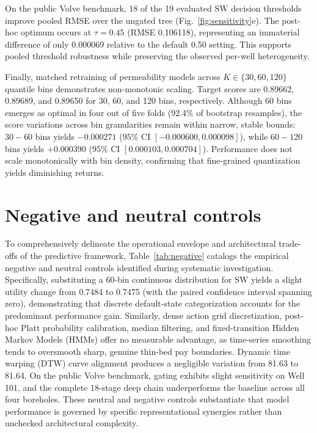 \documentclass[preprint,12pt,nopreprintline]{elsarticle}
\begin{document}
On the public Volve benchmark, 18 of the 19 evaluated $\mathrm{SW}$ decision thresholds improve pooled RMSE over the ungated tree (Fig.~\ref{fig:sensitivity}e). The post-hoc optimum occurs at $\tau = 0.45$ (RMSE 0.106118), representing an immaterial difference of only 0.000069 relative to the default 0.50 setting. This supports pooled threshold robustness while preserving the observed per-well heterogeneity.

Finally, matched retraining of permeability models across $K \in \{30, 60, 120\}$ quantile bins demonstrates non-monotonic scaling. Target scores are 0.89662, 0.89689, and 0.89650 for 30, 60, and 120 bins, respectively. Although 60 bins emerges as optimal in four out of five folds ($92.4\%$ of bootstrap resamples), the score variations across bin granularities remain within narrow, stable bounds: $30 - 60$ bins yields $-0.000271$ ($95\%$ CI $[-0.000600, 0.000098]$), while $60 - 120$ bins yields $+0.000390$ ($95\%$ CI $[0.000103, 0.000704]$). Performance does not scale monotonically with bin density, confirming that fine-grained quantization yields diminishing returns.

\section{Negative and neutral controls}
\label{sec:negative}
To comprehensively delineate the operational envelope and architectural trade-offs of the predictive framework, Table~\ref{tab:negative} catalogs the empirical negative and neutral controls identified during systematic investigation. Specifically, substituting a 60-bin continuous distribution for $\mathrm{SW}$ yields a slight utility change from 0.7484 to 0.7475 (with the paired confidence interval spanning zero), demonstrating that discrete default-state categorization accounts for the predominant performance gain. Similarly, dense action grid discretization, post-hoc Platt probability calibration, median filtering, and fixed-transition Hidden Markov Models (HMMs) \cite{rabiner1989hmm} offer no measurable advantage, as time-series smoothing tends to oversmooth sharp, genuine thin-bed pay boundaries. Dynamic time warping (DTW) curve alignment produces a negligible variation from 81.63 to 81.64. On the public Volve benchmark, gating exhibits slight sensitivity on Well 101, and the complete 18-stage deep chain underperforms the baseline across all four boreholes. These neutral and negative controls substantiate that model performance is governed by specific representational synergies rather than unchecked architectural complexity.
\end{document}
